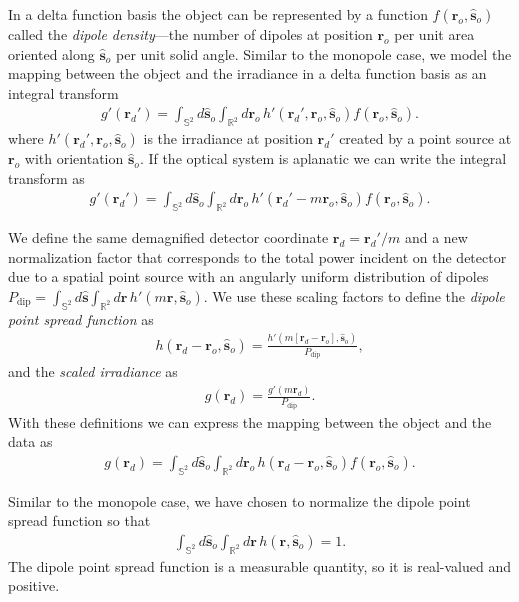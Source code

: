 \documentclass[]{osa-article}
\providecommand{\mb}[1]{\mathbf{#1}}
\providecommand{\ro}{\mathbf{\mathbf{r}}_o}
\providecommand{\so}{\mathbf{\hat{s}}_o}
\providecommand{\rd}{\mathbf{r}_d}
\providecommand{\mh}[1]{\mathbf{\hat{#1}}}
\providecommand{\mbb}[1]{\mathbb{#1}}
\begin{document}
In a delta function basis the object can be represented by a function
$f(\ro, \so)$ called the \textit{dipole density}---the number of dipoles at
position $\ro{}$ per unit area oriented along $\so{}$ per unit solid angle.
Similar to the monopole case, we model the mapping between the object and the
irradiance in a delta function basis as an integral transform
\begin{align}
  g'(\rd') = \int_{\mbb{S}^2}d\so\int_{\mbb{R}^2}d\ro\, h'(\rd', \ro, \so)f(\ro, \so). 
\end{align}
where $h'(\rd', \ro, \so)$ is the irradiance at position $\rd'$ created by a
point source at $\ro$ with orientation $\so$. If the optical system is aplanatic
we can write the integral transform as
\begin{align}
  g'(\rd') = \int_{\mbb{S}^2}d\so\int_{\mbb{R}^2}d\ro\, h'(\rd' - m\ro, \so)f(\ro, \so). 
\end{align}

We define the same demagnified detector coordinate $\rd = \rd'/m$ and a new
normalization factor that corresponds to the total power incident on the
detector due to a spatial point source with an angularly uniform distribution of
dipoles
$P_\text{dip} = \int_{\mbb{S}^2}d\mh{s}\int_{\mbb{R}^2}d\mb{r}\, h'(m\mb{r},
\so)$. We use these scaling factors to define the
\textit{dipole point spread function} as
\begin{align}
  h(\rd - \ro, \so) = \frac{h'(m[\rd - \ro], \so)}{P_\text{dip}}, 
\end{align}
and the \textit{scaled irradiance} as 
\begin{align}
  g(\rd) = \frac{g'(m\rd)}{P_\text{dip}}. 
\end{align}
With these definitions we can express the mapping between the object and the
data as
\begin{align}
g(\rd{}) = \int_{\mbb{S}^2}d\so{}\int_{\mbb{R}^2}d\ro{}\, h(\rd{} -\ro{}, \so{})f(\ro, \so). \label{eq:odpsf}
\end{align}

Similar to the monopole case, we have chosen to normalize the dipole point
spread function so that
\begin{align}
  \int_{\mbb{S}^2}d\so\int_{\mbb{R}^2}d\mb{r}\, h(\mb{r}, \so) = 1. 
\end{align}
The dipole point spread function is a measurable quantity, so it is real-valued
and positive.
\end{document}
